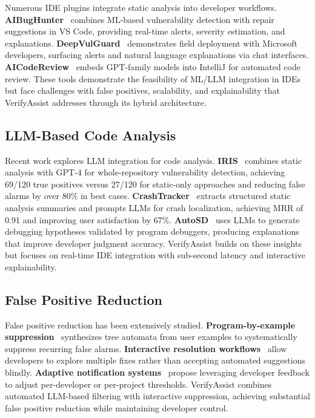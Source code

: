 \documentclass[conference]{IEEEtran}
\begin{document}
Numerous IDE plugins integrate static analysis into developer workflows. \textbf{AIBugHunter}~\cite{fu2023aibughunter} combines ML-based vulnerability detection with repair suggestions in VS Code, providing real-time alerts, severity estimation, and explanations. \textbf{DeepVulGuard}~\cite{kang2024explainable} demonstrates field deployment with Microsoft developers, surfacing alerts and natural language explanations via chat interfaces. \textbf{AICodeReview}~\cite{almeida2023aicodereview} embeds GPT-family models into IntelliJ for automated code review. These tools demonstrate the feasibility of ML/LLM integration in IDEs but face challenges with false positives, scalability, and explainability that VerifyAssist addresses through its hybrid architecture.

\subsection{LLM-Based Code Analysis}

Recent work explores LLM integration for code analysis. \textbf{IRIS}~\cite{li2024llm} combines static analysis with GPT-4 for whole-repository vulnerability detection, achieving 69/120 true positives versus 27/120 for static-only approaches and reducing false alarms by over 80\% in best cases. \textbf{CrashTracker}~\cite{yan2024better} extracts structured static analysis summaries and prompts LLMs for crash localization, achieving MRR of 0.91 and improving user satisfaction by 67\%. \textbf{AutoSD}~\cite{kang2024explainable} uses LLMs to generate debugging hypotheses validated by program debuggers, producing explanations that improve developer judgment accuracy. VerifyAssist builds on these insights but focuses on real-time IDE integration with sub-second latency and interactive explainability.

\subsection{False Positive Reduction}

False positive reduction has been extensively studied. \textbf{Program-by-example suppression}~\cite{lee2022improving} synthesizes tree automata from user examples to systematically suppress recurring false alarms. \textbf{Interactive resolution workflows}~\cite{barik2016quick} allow developers to explore multiple fixes rather than accepting automated suggestions blindly. \textbf{Adaptive notification systems}~\cite{kurtz2022towards} propose leveraging developer feedback to adjust per-developer or per-project thresholds. VerifyAssist combines automated LLM-based filtering with interactive suppression, achieving substantial false positive reduction while maintaining developer control.
\end{document}
